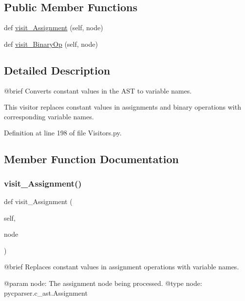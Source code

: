 \subsection*{Public Member Functions}
\begin{DoxyCompactItemize}
\item 
def \hyperlink{classVisitors_1_1ConstToVar_adae6ad6f5b94c4acd95924bb3df9ebc8}{visit\+\_\+\+Assignment} (self, node)
\item 
def \hyperlink{classVisitors_1_1ConstToVar_a6329fbf13e2d22de5384fbca843113b8}{visit\+\_\+\+Binary\+Op} (self, node)
\end{DoxyCompactItemize}


\subsection{Detailed Description}
\begin{DoxyVerb}@brief Converts constant values in the AST to variable names.

This visitor replaces constant values in assignments and binary operations with corresponding variable names.\end{DoxyVerb}
 

Definition at line 198 of file Visitors.\+py.



\subsection{Member Function Documentation}
\mbox{\label{classVisitors_1_1ConstToVar_adae6ad6f5b94c4acd95924bb3df9ebc8}} 
\subsubsection{\texorpdfstring{visit\+\_\+\+Assignment()}{visit\_Assignment()}}
{\footnotesize\ttfamily def visit\+\_\+\+Assignment (\begin{DoxyParamCaption}\item[{}]{self,  }\item[{}]{node }\end{DoxyParamCaption})}

\begin{DoxyVerb}@brief Replaces constant values in assignment operations with variable names.

@param node: The assignment node being processed.
@type node: pycparser.c_ast.Assignment
\end{DoxyVerb}
 

